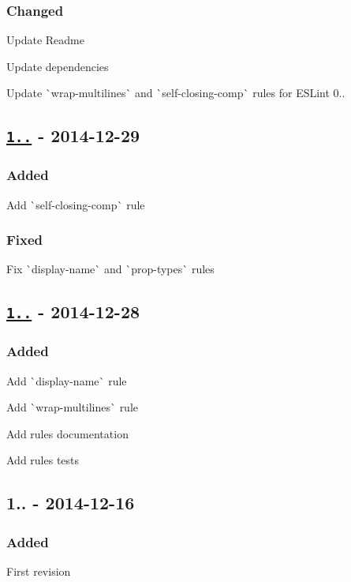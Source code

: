 \subsubsection*{Changed}


\begin{DoxyItemize}
\item Update Readme
\item Update dependencies
\item Update \`{}wrap-\/multilines\`{} and \`{}self-\/closing-\/comp\`{} rules for E\+S\+Lint 0..
\end{DoxyItemize}

\subsection*{\href{https://github.com/yannickcr/eslint-plugin-react/compare/v1.1.0...v1.2.0}{\tt 1..} -\/ 2014-\/12-\/29}

\subsubsection*{Added}


\begin{DoxyItemize}
\item Add \`{}self-\/closing-\/comp\`{} rule
\end{DoxyItemize}

\subsubsection*{Fixed}


\begin{DoxyItemize}
\item Fix \`{}display-\/name\`{} and \`{}prop-\/types\`{} rules
\end{DoxyItemize}

\subsection*{\href{https://github.com/yannickcr/eslint-plugin-react/compare/v1.0.0...v1.1.0}{\tt 1..} -\/ 2014-\/12-\/28}

\subsubsection*{Added}


\begin{DoxyItemize}
\item Add \`{}display-\/name\`{} rule
\item Add \`{}wrap-\/multilines\`{} rule
\item Add rules documentation
\item Add rules tests
\end{DoxyItemize}

\subsection*{1.. -\/ 2014-\/12-\/16}

\subsubsection*{Added}


\begin{DoxyItemize}
\item First revision 
\end{DoxyItemize}